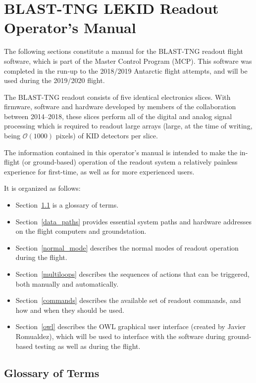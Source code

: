 \chapter{BLAST-TNG LEKID Readout Operator's Manual}\label{mcp}

The following sections constitute a manual for the BLAST-TNG readout flight software, which is part of the Master Control Program (MCP). This software was completed in the run-up to the 2018/2019 Antarctic flight attempts, and will be used during the 2019/2020 flight.

The BLAST-TNG readout consists of five identical electronics slices. With firmware, software and hardware developed by members of the collaboration between 2014--2018, these slices perform all of the digital and analog signal processing which is required to readout large arrays (large, at the time of writing, being $\mathcal{O}(1000)$ pixels) of KID detectors per slice.

The information contained in this operator’s manual is intended to make the in-flight (or ground-based) operation of the readout system a relatively painless experience for first-time, as well as for more experienced users.

It is organized as follows:
\begin{itemize}[nosep]
  \item Section~\ref{gloss} is a glossary of terms.
  \item Section~\ref{data_paths} provides essential system paths and hardware addresses on the flight computers and groundstation.
  \item Section~\ref{normal_mode} describes the normal modes of readout operation during the flight.
  \item Section~\ref{multiloops} describes the sequences of actions that can be triggered, both manually and automatically.
  \item Section~\ref{commands} describes the available set of readout commands, and how and when they should be used.
  \item Section~\ref{owl} describes the OWL graphical user interface (created by Javier Romualdez), which will be used to interface with the software during ground-based testing as well as during the flight.
\end{itemize}

\section{Glossary of Terms}\label{gloss}

